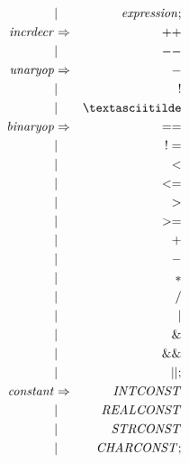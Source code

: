 \documentclass{article}
\begin{document}
\begin{eqnarray}
    & | & \mathit{expression};\\
    \mathit{incrdecr} & \Rightarrow & \mathit{++} \\
    & | & \mathit{--}\\
    \mathit{unaryop} & \Rightarrow & \mathit{-} \\
    & | & \mathit{!}\\
    & | & \mathit{\textasciitilde}\\
    \mathit{binaryop} & \Rightarrow & \mathit{==} \\
    & | & \mathit{!=}\\
    & | & \mathit{<} \\
    & | & \mathit{<=}\\
    & | & \mathit{>}\\
    & | & \mathit{>=}\\
    & | & \mathit{+}\\
    & | & \mathit{-}\\
    & | & \mathit{*}\\
    & | & \mathit{/}\\
    & | & \mathit{|}\\
    & | & \mathit{\&}\\
    & | & \mathit{\&\&}\\
    & | & \mathit{||};\\
    \mathit{constant} & \Rightarrow & \mathit{INTCONST}\\
    & | &\mathit{REALCONST}\\
    & | &\mathit{STRCONST}\\
    & | &\mathit{CHARCONST};
\end{eqnarray}
\end{document}
